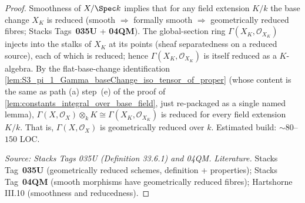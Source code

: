 \begin{proof}
  
  \leanok
  Smoothness of \(X / \Spec k\) implies that for any field extension \(K / k\) the base change \(X_K\) is reduced (smooth \(\Rightarrow\) formally smooth \(\Rightarrow\) geometrically reduced fibres; Stacks Tags~\textbf{035U} + \textbf{04QM}). The global-section ring \(\Gamma(X_K, \mathcal O_{X_K})\) injects into the stalks of \(X_K\) at its points (sheaf separatedness on a reduced source), each of which is reduced; hence \(\Gamma(X_K, \mathcal O_{X_K})\) is itself reduced as a \(K\)-algebra. By the flat-base-change identification \cref{lem:S3_pi_1_Gamma_baseChange_iso_tensor_of_proper} (whose content is the same as path (a) step~(e) of the proof of \cref{lem:constants_integral_over_base_field}, just re-packaged as a single named lemma), \(\Gamma(X, \mathcal O_X) \otimes_k K \cong \Gamma(X_K, \mathcal O_{X_K})\) is reduced for every field extension \(K / k\). That is, \(\Gamma(X, \mathcal O_X)\) is geometrically reduced over \(k\). Estimated build: \(\sim 80\)--\(150\) LOC.

  \textit{Source: Stacks Tags 035U (Definition 33.6.1) and 04QM.}
  \emph{Literature.} Stacks Tag~\textbf{035U} (geometrically reduced schemes, definition + properties); Stacks Tag~\textbf{04QM} (smooth morphisms have geometrically reduced fibres); Hartshorne III.10 (smoothness and reducedness).
\end{proof}

